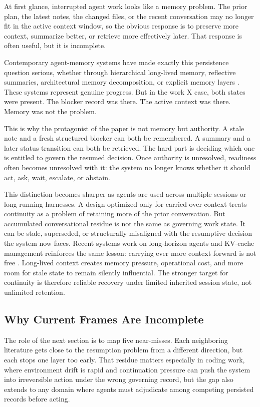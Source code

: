 \documentclass[preprint,12pt]{elsarticle}
\begin{document}
At first glance, interrupted agent work looks like a memory problem. The prior plan, the latest notes, the changed files, or the recent conversation may no longer fit in the active context window, so the obvious response is to preserve more context, summarize better, or retrieve more effectively later. That response is often useful, but it is incomplete.

Contemporary agent-memory systems have made exactly this persistence question serious, whether through hierarchical long-lived memory, reflective summaries, architectural memory decomposition, or explicit memory layers \cite{Packer2023,Shinn2023,Sumers2023,ZhangMemory2024,Chhikara2025}. These systems represent genuine progress. But in the work X case, both states were present. The blocker record was there. The active context was there. Memory was not the problem.

This is why the protagonist of the paper is not memory but authority. A stale note and a fresh structured blocker can both be remembered. A summary and a later status transition can both be retrieved. The hard part is deciding which one is entitled to govern the resumed decision. Once authority is unresolved, readiness often becomes unresolved with it: the system no longer knows whether it should act, ask, wait, escalate, or abstain.

This distinction becomes sharper as agents are used across multiple sessions or long-running harnesses. A design optimized only for carried-over context treats continuity as a problem of retaining more of the prior conversation. But accumulated conversational residue is not the same as governing work state. It can be stale, superseded, or structurally misaligned with the resumptive decision the system now faces. Recent systems work on long-horizon agents and KV-cache management reinforces the same lesson: carrying ever more context forward is not free \cite{Wang2026,Wu2026}. Long-lived context creates memory pressure, operational cost, and more room for stale state to remain silently influential. The stronger target for continuity is therefore reliable recovery under limited inherited session state, not unlimited retention.

\subsection{Why Current Frames Are Incomplete}

The role of the next section is to map five near-misses. Each neighboring literature gets close to the resumption problem from a different direction, but each stops one layer too early. That residue matters especially in coding work, where environment drift is rapid and continuation pressure can push the system into irreversible action under the wrong governing record, but the gap also extends to any domain where agents must adjudicate among competing persisted records before acting.
\end{document}
